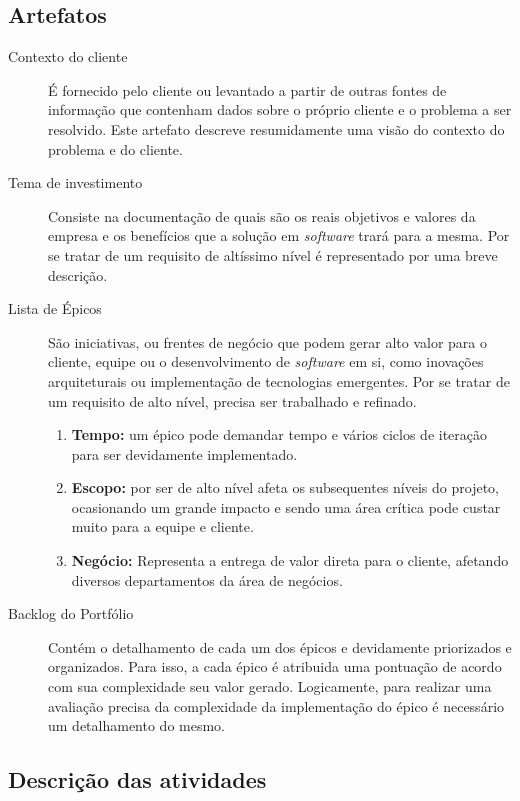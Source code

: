\subsection{Artefatos}
\begin{description}
\item[Contexto do cliente] É fornecido pelo cliente ou levantado a partir de outras fontes de informação que contenham dados sobre o próprio cliente e o problema a ser resolvido. Este artefato descreve resumidamente uma visão do contexto do problema e do cliente.
\item[Tema de investimento] Consiste na documentação de quais são os reais objetivos e valores da empresa e os benefícios que a solução em \textit{software} trará para a mesma. Por se tratar de um requisito de altíssimo nível é representado por uma breve descrição.
\item[Lista de Épicos] São iniciativas, ou frentes de negócio que podem gerar alto valor para o cliente, equipe ou o desenvolvimento de \textit{software} em si, como inovações arquiteturais ou implementação de tecnologias emergentes. Por se tratar de um requisito de alto nível, precisa ser trabalhado e refinado.
  \begin{enumerate}
    \item \textbf{Tempo:} um épico pode demandar tempo e vários ciclos de iteração para ser devidamente implementado.
    \item \textbf{Escopo:} por ser de alto nível afeta os subsequentes níveis do projeto, ocasionando um grande impacto e sendo uma área crítica pode custar muito para a equipe e cliente.
    \item \textbf{Negócio:} Representa a entrega de valor direta para o cliente, afetando diversos departamentos da área de negócios.
  \end{enumerate} 
\item[Backlog do Portfólio] Contém o detalhamento de cada um dos épicos e devidamente priorizados e organizados. Para isso, a cada épico é atribuida uma pontuação de acordo com sua complexidade seu valor gerado. Logicamente, para realizar uma avaliação precisa da complexidade da implementação do épico é necessário um detalhamento do mesmo.
\end{description}

\subsection{Descrição das atividades}

